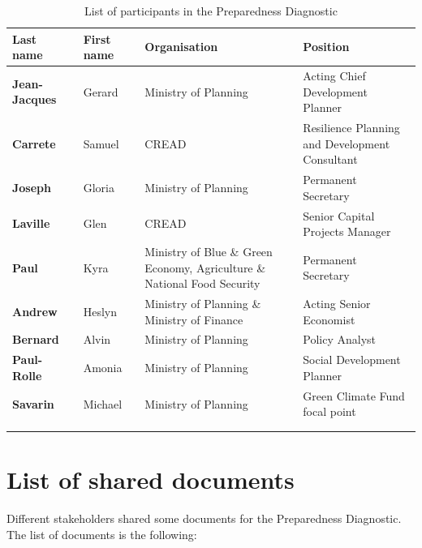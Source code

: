 \documentclass[
  10pt,
]{book}
\begin{document}
\begin{table}

\caption{\label{tab:unnamed-chunk-2}List of participants in the Preparedness Diagnostic}
\centering
\fontsize{15}{17}\selectfont
\begin{tabu} to 
\hline
Last name  & First name  & Organisation  & Position \\
\hline
\textbf{Jean-Jacques } & Gerard  & Ministry of Planning  & Acting Chief Development Planner \\
\hline
\textbf{Carrete } & Samuel  & CREAD  & Resilience Planning and Development Consultant \\
\hline
\textbf{Joseph } & Gloria  & Ministry of Planning  & Permanent Secretary \\
\hline
\textbf{Laville } & Glen  & CREAD  & Senior Capital Projects Manager \\
\hline
\textbf{Paul } & Kyra  & Ministry of Blue \& Green Economy, Agriculture \& National Food Security  & Permanent Secretary \\
\hline
\textbf{Andrew } & Heslyn  & Ministry of Planning \& Ministry of Finance  & Acting Senior Economist \\
\hline
\textbf{Bernard } & Alvin  & Ministry of Planning  & Policy Analyst \\
\hline
\textbf{Paul-Rolle } & Amonia  & Ministry of Planning  & Social Development Planner \\
\hline
\textbf{Savarin } & Michael  & Ministry of Planning  & Green Climate Fund focal point \\
\hline
{}\\
\\
\end{tabu}
\end{table}

\hypertarget{appendixE}{%
\chapter{List of shared documents}\label{appendixE}}

Different stakeholders shared some documents for the Preparedness Diagnostic. The list of documents is the following:
\end{document}
